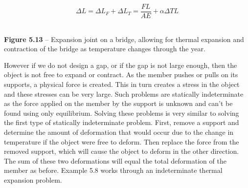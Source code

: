 \documentclass[
  letterpaper,
  DIV=11,
  numbers=noendperiod]{scrreprt}
\begin{document}
\[
\Delta L=\Delta L_F+\Delta L_T=\frac{F L}{A E}+\alpha \Delta T L\]

\strut \\

\textbf{Figure 5.13} -- Expansion joint on a bridge, allowing for
thermal expansion and contraction of the bridge as temperature changes
through the year.

However if we do not design a gap, or if the gap is not large enough,
then the object is not free to expand or contract. As the member pushes
or pulls on its supports, a physical force is created. This in turn
creates a stress in the object and these stresses can be very large.
Such problems are statically indeterminate as the force applied on the
member by the support is unknown and can't be found using only
equilibrium. Solving these problems is very similar to solving the first
type of statically indeterminate problem. First, remove a support and
determine the amount of deformation that would occur due to the change
in temperature if the object were free to deform. Then replace the force
from the removed support, which will cause the object to deform in the
other direction. The sum of these two deformations will equal the total
deformation of the member as before. Example 5.8 works through an
indeterminate thermal expansion problem.
\end{document}
